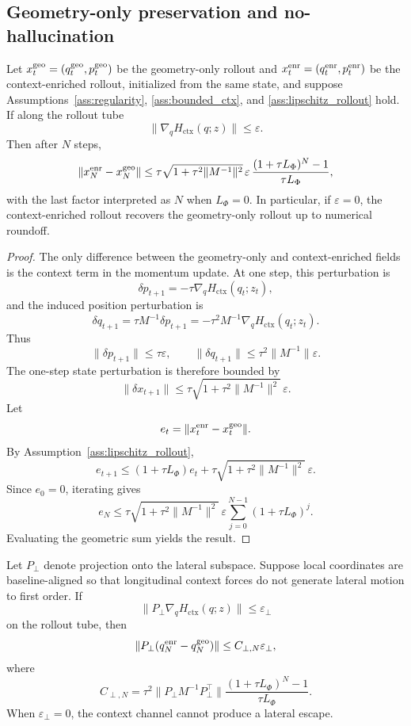 \subsection{Geometry-only preservation and no-hallucination}

\begin{theorem}
\label{thm:scaffold_preservation}
Let \(x_t^{\rm geo}=(q_t^{\rm geo},p_t^{\rm geo})\) be the geometry-only rollout and
\(x_t^{\rm enr}=(q_t^{\rm enr},p_t^{\rm enr})\) be the context-enriched rollout, initialized from the same
state, and suppose Assumptions~\ref{ass:regularity},
\ref{ass:bounded_ctx}, and \ref{ass:lipschitz_rollout} hold. If along the rollout tube
\[
    \|\nabla_qH_{\mathrm{ctx}}(q;z)\|\le \varepsilon .
\]
Then after \(N\) steps,
\[
    \|x_N^{\rm enr}-x_N^{\rm geo}\|
    \le
    \tau\sqrt{1+\tau^2\|M^{-1}\|^2}\,
    \varepsilon\,
    \frac{(1+\tau L_\Phi)^N-1}{\tau L_\Phi},
\]
with the last factor interpreted as \(N\) when \(L_\Phi=0\). In particular, if
\(\varepsilon=0\), the context-enriched rollout recovers the geometry-only rollout up to numerical
roundoff.
\end{theorem}

\begin{proof}
The only difference between the geometry-only and context-enriched fields is the context term in the
momentum update. At one step, this perturbation is
\[
    \delta p_{t+1}
    =
    -\tau\nabla_qH_{\mathrm{ctx}}(q_t;z_t),
\]
and the induced position perturbation is
\[
    \delta q_{t+1}
    =
    \tau M^{-1}\delta p_{t+1}
    =
    -\tau^2M^{-1}\nabla_qH_{\mathrm{ctx}}(q_t;z_t).
\]
Thus
\[
    \|\delta p_{t+1}\|\le \tau\varepsilon,
    \qquad
    \|\delta q_{t+1}\|\le \tau^2\|M^{-1}\|\varepsilon.
\]
The one-step state perturbation is therefore bounded by
\[
    \|\delta x_{t+1}\|
    \le
    \tau\sqrt{1+\tau^2\|M^{-1}\|^2}\,\varepsilon .
\]
Let
\[
    e_t=\|x_t^{\rm enr}-x_t^{\rm geo}\|.
\]
By Assumption~\ref{ass:lipschitz_rollout},
\[
    e_{t+1}
    \le
    (1+\tau L_\Phi)e_t
    +
    \tau\sqrt{1+\tau^2\|M^{-1}\|^2}\,\varepsilon .
\]
Since \(e_0=0\), iterating gives
\[
    e_N
    \le
    \tau\sqrt{1+\tau^2\|M^{-1}\|^2}\,\varepsilon
    \sum_{j=0}^{N-1}(1+\tau L_\Phi)^j .
\]
Evaluating the geometric sum yields the result.
\end{proof}

\begin{corollary}
\label{cor:no_hallucination}
Let \(P_\perp\) denote projection onto the lateral subspace. Suppose local
coordinates are baseline-aligned so that longitudinal context forces do not generate
lateral motion to first order. If
\[
    \|P_\perp\nabla_qH_{\mathrm{ctx}}(q;z)\|\le \varepsilon_\perp
\]
on the rollout tube, then
\[
    \|P_\perp(q_N^{\rm enr}-q_N^{\rm geo})\|
    \le
    C_{\perp,N}\varepsilon_\perp,
\]
where
\[
    C_{\perp,N}
    =
    \tau^2
    \|P_\perp M^{-1}P_\perp^\top\|
    \frac{(1+\tau L_\Phi)^N-1}{\tau L_\Phi}.
\]
When \(\varepsilon_\perp=0\), the context channel cannot produce a lateral escape.
\end{corollary}


